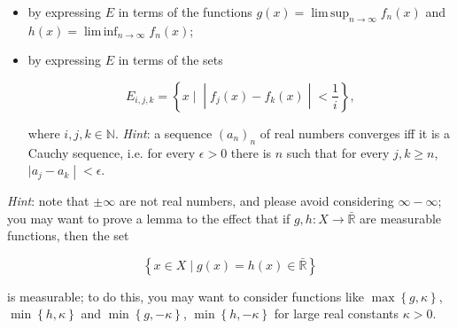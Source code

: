 \documentclass{qlnotes-export}
\begin{document}
\begin{itemize}
\item
  by expressing \(E\) in terms of the functions \(g(x) = \operatorname{lim\, sup}_{n\rightarrow\infty}f_{n}(x)\) and \(h(x) = \operatorname{lim\, inf}_{n\rightarrow\infty}f_{n}(x)\);
\item
  by expressing \(E\) in terms of the sets

  \[E_{i,j,k} = \left\{ x \mid \middle| f_{j}(x) - f_{k}(x) \middle| < \frac{1}{i} \right\},\]

  where \(i,j,k \in {\mathbb{N}}\). \emph{Hint}: a sequence \((a_{n})_{n}\) of real numbers converges iff it is a Cauchy sequence, i.e. for every \(\epsilon > 0\) there is \(n\) such that for every \(j,k \geq n\), \(\left. |a_{j} - a_{k} \middle| < \epsilon \right.\).
\end{itemize}

\emph{Hint}: note that \(\pm \infty\) are not real numbers, and please avoid considering \(\infty - \infty\); you may want to prove a lemma to the effect that if \(g,h:X\rightarrow\bar{\mathbb{R}}\) are measurable functions, then the set

\[\left\{ {x \in X \mid g(x) = h(x) \in \bar{\mathbb{R}}} \right\}\]

is measurable; to do this, you may want to consider functions like \(\max\left\{ {g,\kappa} \right\}\), \(\min\left\{ {h,\kappa} \right\}\) and \(\min\left\{ {g, - \kappa} \right\}\), \(\min\left\{ {h, - \kappa} \right\}\) for large real constants \(\kappa > 0\).
\end{document}
